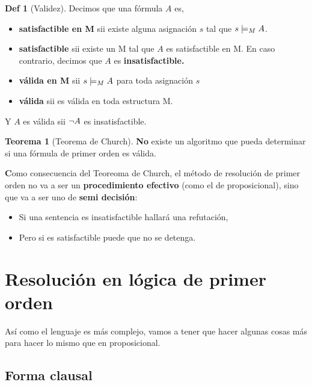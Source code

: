 \documentclass{report}
\theoremstyle{definition} %
\newtheorem{theorem}{Teorema}[chapter]
\newtheorem*{definition*}{Def}
\newenvironment{nota}[1]
    {\begin{leftbar}\textbf{#1}}
    {\end{leftbar}}
\begin{document}
\begin{definition*}[Validez]
    Decimos que una fórmula $A$ es,

    \begin{itemize}
        \item \textbf{satisfactible en M} sii existe alguna asignación $s$ tal
        que $s \models_M A$.
        \item \textbf{satisfactible} sii existe un M tal que $A$ es
        satisfactible en M. En caso contrario, decimos que $A$ es
        \textbf{insatisfactible.}
        \item \textbf{válida en M} sii $s \models_M A$ para toda asignación $s$
        \item \textbf{válida} sii es válida en toda estructura M.
    \end{itemize}

    Y $A$ es válida sii $\neg A$ es insatisfactible.
\end{definition*}

\begin{theorem}[Teorema de Church]
    \textbf{No} existe un algoritmo que pueda determinar si una fórmula de
    primer orden es válida.
\end{theorem}

\begin{nota}
    Como consecuencia del Teoreoma de Church, el método de resolución de primer
    orden no va a ser un \textbf{procedimiento efectivo} (como el de
    proposicional), sino que va a ser uno de \textbf{semi decisión}:
    \begin{itemize}
        \item Si una sentencia es insatisfactible hallará una refutación,
        \item Pero si es satisfactible puede que no se detenga.
    \end{itemize}
\end{nota}

\section{Resolución en lógica de primer orden}

Así como el lenguaje es más complejo, vamos a tener que hacer algunas cosas más
para hacer lo mismo que en proposicional.

\subsection{Forma clausal}
\end{document}
